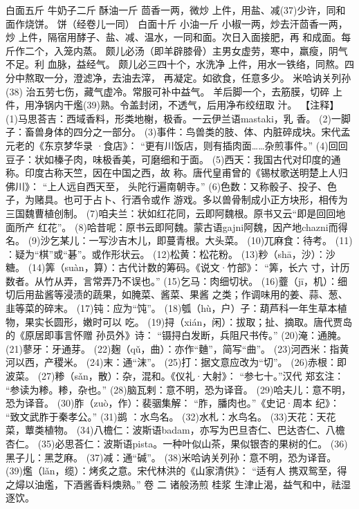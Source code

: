 \documentclass[12pt,UTF8]{ctexbook}
\begin{document}
白面五斤 牛奶子二斤 酥油一斤 茴香一两，微炒
上件，用盐、减(37)少许，同和面作烧饼。
饼（经卷儿一同）
白面十斤 小油一斤 小椒一两，炒去汗茴香一两，炒
上件，隔宿用酵子、盐、减、温水，一同和面。次日入面接肥，再
和成面。每斤作二个，入笼内蒸。
颇儿必汤（即羊辟膝骨）主男女虚劳，寒中，羸瘦，阴气不足。利
血脉，益经气。
颇儿必三四十个，水洗净
上件，用水一铁络，同熬。四分中熬取一分，澄滤净，去油去滓，
再凝定。如欲食，任意多少。
米哈讷关列孙(38) 治五劳七伤，藏气虚冷。常服可补中益气。
羊后脚一个，去筋膜，切碎
上件，用净锅内干爁(39)熟。令盖封闭，不透气，后用净布绞纽取
汁。
【注释】
(1)马思荅吉：西域香料，形类地榭，极香。一云伊兰语mastaki，乳
香。
(2)一脚子：畜兽身体的四分之一部分。
(3)事件：鸟兽类的肢、体、内脏碎成块。宋代孟元老的《东京梦华录
·食店》：
“更有川饭店，则有插肉面……杂煎事件。”
(4)回回豆子：状如榛子肉，味极香美，可磨细和于面。
(5)西天：我国古代对印度的通称。印度古称天竺，因在中国之西，故
称。唐代皇甫曾的《锡杖歌送明楚上人归佛川》：
“上人远自西天至，
头陀行遍南朝寺。”
(6)色数：又称骰子、投子、色子，为赌具。也可于占卜、行酒令或作
游戏。多以兽骨制成小正方块形，相传为三国魏曹植创制。
(7)咱夫兰：状如红花同，云即阿魏根。原书又云“即是回回地面所产
红花”。
(8)哈昔呢：原书云即阿魏。蒙古语gajni阿魏，因产地chazni而得名。
(9)沙乞某儿：一写沙吉木儿，即蔓青根。大头菜。
(10)兀麻食：待考。
(11) ：疑为“棋”或“碁”。或作形状云。
(12)松黄：松花粉。
(13)粆（shā，沙）：沙糖。
(14)筭（suàn，算）：古代计数的筹码。《说文·竹部》：
“筭，长六
寸，计历数者。从竹从弄，言常弄乃不误也。”
(15)乞马：肉细切状。
(16)虀（jī，机）：细切后用盐酱等浸渍的蔬果，如腌菜、酱菜、果酱
之类；作调味用的姜、蒜、葱、韭等菜的碎末。
(17)钝：应为“饨”。
(18)瓠（hù，户）子：葫芦科一年生草本植物，果实长圆形，嫩时可以
吃。
(19)挦（xián，闲）：拔取；扯、摘取。唐代贾岛的《原居即事言怀赠
孙员外》诗：
“镊挦白发断，兵阻尺书传。”
(20)淹：通腌。
(21)蓼牙：牙通芽。
(22)麹（qǔ，曲）：亦作“麯”，简写“曲”。
(23)河西米：指黄河以西，产稷米。
(24)末：通“沫”。
(25)打：据文意应改为“切”。
(26)赤根：即波菜。
(27)糁（sǎn，散）：杂，混和。《仪礼·大射》：
“参七十。”汉代
郑玄注：
“参读为糁。糁，杂也。”
(28)脑瓦剌：意不明，恐为译音。
(29)哈夫儿：意不明，恐为译音。
(30)胙（zuò，作）：裴骃集解：
“胙，膰肉也。”《史记·周本
纪》：
“致文武胙于秦孝公。”
(31)鹚 ：水鸟名。
(32)水札：水鸟名。
(33)天花：天花菜，蕈类植物。
(34)八檐仁：波斯语badam，亦写为巴旦杏仁、巴达杏仁、八檐杏仁。
(35)必思荅仁：波斯语pista。一种叶似山茶，果似银杏的果树的仁。
(36)黑子儿：黑芝麻。
(37)减：通“碱”。
(38)米哈讷关列孙：意不明，恐为译音。
(39)爁（lǎn，缆）：烤炙之意。宋代林洪的《山家清供》：
“适有人
携双鸳至，得之燖以油爁，下酒酱香料燠熟。”
卷 二
诸般汤煎
桂浆 生津止渴，益气和中，祛湿逐饮。
\end{document}
